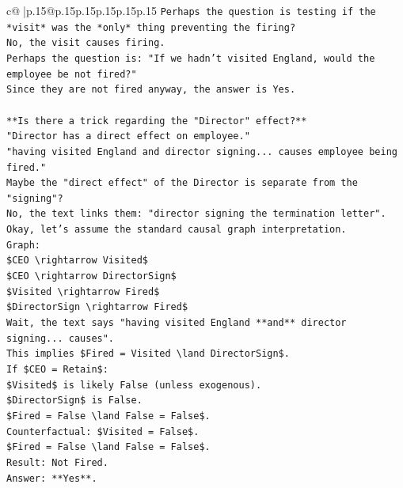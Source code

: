 \documentclass{article}
\begin{document}
{\begin{supertabular}{c@{$\;$}|p{.15\linewidth}@{}p{.15\linewidth}p{.15\linewidth}p{.15\linewidth}p{.15\linewidth}p{.15\linewidth}}
{{{\texttt{Perhaps the question is testing if the *visit* was the *only* thing preventing the firing?} \\
\texttt{No, the visit causes firing.} \\
\texttt{Perhaps the question is: "If we hadn't visited England, would the employee be not fired?"} \\
\texttt{Since they are not fired anyway, the answer is Yes.} \\
\\ 
\texttt{**Is there a trick regarding the "Director" effect?**} \\
\texttt{"Director has a direct effect on employee."} \\
\texttt{"having visited England and director signing... causes employee being fired."} \\
\texttt{Maybe the "direct effect" of the Director is separate from the "signing"?} \\
\texttt{No, the text links them: "director signing the termination letter".} \\
\texttt{Okay, let's assume the standard causal graph interpretation.} \\
\texttt{Graph:} \\
\texttt{\$CEO \textbackslash{}rightarrow Visited\$} \\
\texttt{\$CEO \textbackslash{}rightarrow DirectorSign\$} \\
\texttt{\$Visited \textbackslash{}rightarrow Fired\$} \\
\texttt{\$DirectorSign \textbackslash{}rightarrow Fired\$} \\
\texttt{Wait, the text says "having visited England **and** director signing... causes".} \\
\texttt{This implies \$Fired = Visited \textbackslash{}land DirectorSign\$.} \\
\texttt{If \$CEO = Retain\$:} \\
\texttt{\$Visited\$ is likely False (unless exogenous).} \\
\texttt{\$DirectorSign\$ is False.} \\
\texttt{\$Fired = False \textbackslash{}land False = False\$.} \\
\texttt{Counterfactual: \$Visited = False\$.} \\
\texttt{\$Fired = False \textbackslash{}land False = False\$.} \\
\texttt{Result: Not Fired.} \\
\texttt{Answer: **Yes**.} \\
}}}
\end{supertabular}}
\end{document}
